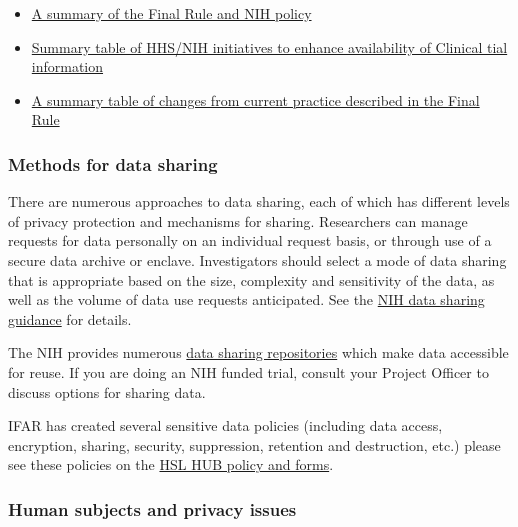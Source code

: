 \documentclass[]{book}
\providecommand{\tightlist}{%
  \setlength{\itemsep}{0pt}\setlength{\parskip}{0pt}}
\theoremstyle{definition}
\theoremstyle{definition}
\theoremstyle{definition}
\theoremstyle{remark}
\begin{document}
\begin{itemize}
\tightlist
\item
  \href{https://www.nih.gov/news-events/summary-hhs-nih-initiatives-enhance-availability-clinical-trial-information}{A
  summary of the Final Rule and NIH policy}
\item
  \href{https://www.nih.gov/news-events/summary-table-hhs-nih-initiatives-enhance-availability-clinical-trial-information}{Summary
  table of HHS/NIH initiatives to enhance availability of Clinical tial
  information}
\item
  \href{https://prsinfo.clinicaltrials.gov/FinalRuleChanges-16Sept2016.pdf}{A
  summary table of changes from current practice described in the Final
  Rule}
\end{itemize}

\subsubsection{Methods for data sharing}\label{methods-for-data-sharing}

There are numerous approaches to data sharing, each of which has
different levels of privacy protection and mechanisms for sharing.
Researchers can manage requests for data personally on an individual
request basis, or through use of a secure data archive or enclave.
Investigators should select a mode of data sharing that is appropriate
based on the size, complexity and sensitivity of the data, as well as
the volume of data use requests anticipated. See the
\href{http://grants.nih.gov/grants/policy/data_sharing/data_sharing_guidance.htm\#methods}{NIH
data sharing guidance} for details.

The NIH provides numerous
\href{https://www.nlm.nih.gov/NIHbmic/nih_data_sharing_repositories.html}{data
sharing repositories} which make data accessible for reuse. If you are
doing an NIH funded trial, consult your Project Officer to discuss
options for sharing data.

IFAR has created several sensitive data policies (including data access,
encryption, sharing, security, suppression, retention and destruction,
etc.) please see these policies on the
\href{http://thehslhub/Departments/Roslindale/HSL-IFAR/Administration/Policies-and-Forms}{HSL
HUB policy and forms}.

\subsubsection{Human subjects and privacy
issues}\label{human-subjects-and-privacy-issues}
\end{document}

